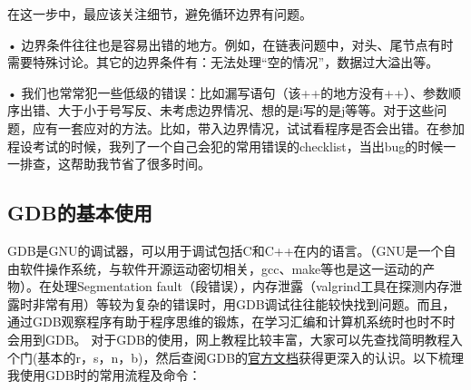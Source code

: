\documentclass[UTF8]{ctexart}
\begin{document}

在这一步中，最应该关注细节，避免循环边界有问题。

• 边界条件往往也是容易出错的地方。例如，在链表问题中，对头、尾节点有时需要特殊讨论。其它的边界条件有：无法处理“空的情况”，数据过大溢出等。

• 我们也常常犯一些低级的错误：比如漏写语句（该++的地方没有++）、参数顺序出错、大于小于号写反、未考虑边界情况、想的是i写的是j等等。对于这些问题，应有一套应对的方法。比如，带入边界情况，试试看程序是否会出错。在参加程设考试的时候，我列了一个自己会犯的常用错误的checklist，当出bug的时候一一排查，这帮助我节省了很多时间。

\subsection{GDB的基本使用}
GDB是GNU的调试器，可以用于调试包括C和C++在内的语言。（GNU是一个自由软件操作系统，与软件开源运动密切相关，gcc、make等也是这一运动的产物）。在处理Segmentation fault（段错误），内存泄露（valgrind工具在探测内存泄露时非常有用）等较为复杂的错误时，用GDB调试往往能较快找到问题。而且，通过GDB观察程序有助于程序思维的锻炼，在学习汇编和计算机系统时也时不时会用到GDB。
对于GDB的使用，网上教程比较丰富，大家可以先查找简明教程入个门(基本的r，s，n，b)，然后查阅GDB的\href{https://sourceware.org/gdb/current/onlinedocs/gdb.html/index.html}{官方文档}获得更深入的认识。以下梳理我使用GDB时的常用流程及命令：
\end{document}
